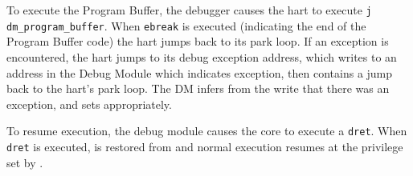 To execute the Program Buffer, the debugger causes the hart to execute
{\tt j dm\_program\_buffer}. When {\tt ebreak} is executed (indicating the end of the
Program Buffer code) the hart jumps back to its park loop. If an exception is
encountered, the hart jumps to its debug exception address, which
writes to an address in the Debug Module which indicates exception, then
contains a jump back to the hart's park loop.
The DM infers from the write that there was an exception, and sets \Fcmderr appropriately.

To resume execution, the debug module causes the core to execute a {\tt dret}.
When {\tt dret} is executed, \Rpc is restored from \Rdpc and normal execution resumes at the
privilege set by \Fprv.

